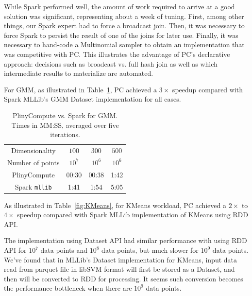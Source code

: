 While Spark performed well, the 
amount of work required to arrive at a good solution 
was significant, representing about a week of tuning.  First, among other things, our Spark expert had to force a 
broadcast join.  Then, it was necessary to force Spark to
persist the result of one of the joins for later use.  Finally, it was necessary to hand-code a 
Multinomial sampler to obtain an implementation that was competitive with PC.
This illustrates the advantage of PC's declarative approach: decisions such as broadcast vs. full hash
join as well as which intermediate results to materialize are
automated. 

\vspace{5pt}
For GMM, as illustrated in Table~\ref{fig:Gmm}, PC achieved a 
$3\times$ speedup compared with Spark MLLib's GMM Dataset implementation for all cases.

\begin{table}[h!]
\begin{center}
\begin{tabular}{|c||c|c|c||}
\hline
Dimensionality & $100$ & $300$ & $500$ \\
Number of points & $10^7$ & $10^6$ & $10^6$ \\
\hline
\hline
PlinyCompute &00:30 & 00:38 & 1:42 \\
Spark \texttt{mllib} &1:41  &1:54 &5:05 \\
\hline
\end{tabular}
\caption{PlinyCompute vs. Spark for GMM. Times in MM:SS, averaged over five iterations.}
\label{fig:Gmm}
\end{center}
\end{table}



\vspace{5pt}
As illustrated in Table~\ref{fig:KMeans}, for KMeans workload, PC achieved a $2\times$ to
$4\times$ speedup compared with Spark MLLib implementation of KMeans
using RDD API. 

The implementation using Dataset API had similar
performance with using RDD API for $10^7$ data points and $10^8$ data
points, but much slower for $10^9$ data points. We've found that
in MLLib's Dataset implementation for KMeans, input data read from
parquet file in libSVM format will first be stored as a Dataset, and
then will be converted to RDD for processing. It seems such conversion
becomes the performance bottleneck when there are $10^9$ data points.

